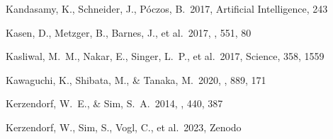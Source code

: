 \documentclass[twocolumn,twocolappendix]{aastex63}
\begin{document}
\begin{thebibliography}{}




 Kandasamy, K., Schneider, J., P{\'o}czos, B.\ 2017, Artificial Intelligence, 243








 Kasen, D., Metzger, B., Barnes, J., et al.\ 2017, \nat, 551, 80




 Kasliwal, M.~M., Nakar, E., Singer, L.~P., et al.\ 2017, Science, 358, 1559








 Kawaguchi, K., Shibata, M., \& Tanaka, M.\ 2020, \apj, 889, 171


 Kerzendorf, W.~E., \& Sim, S.~A.\ 2014, \mnras, 440, 387


 Kerzendorf, W., Sim, S., Vogl, C., et al.\ 2023, Zenodo






\end{thebibliography}
\end{document}
